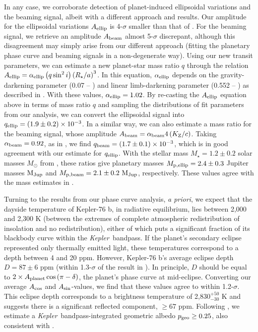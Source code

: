 \documentclass[manuscript]{aastex62}
\newcommand{\kepler}{{\it Kepler}}
\begin{document}
In any case, we corroborate detection of planet-induced ellipsoidal variations and the beaming signal, albeit with a different approach and results. Our amplitude for the ellipsoidal variations $A_{\rm ellip}$ is 4-$\sigma$ smaller than that of \citet{2013ApJ...771...26F}. For the beaming signal, we retrieve an amplitude $A_{\rm beam}$ almost 5-$\sigma$ discrepant, although this disagreement may simply arise from our different approach (fitting the planetary phase curve and beaming signals in a non-degenerate way). Using our new transit parameters, we can estimate a new planet-star mass ratio $q$ through the relation $A_{\rm ellip} = \alpha_{\rm ellip} \left( q \sin^2 i \right) \left( R_\star / a \right)^{3}$. In this equation, $\alpha_{\rm ellip}$ depends on the gravity-darkening parameter (0.07 -- \citealp{2011AA...529A..75C}) and linear limb-darkening parameter (0.552 -- \citealp{2015MNRAS.450.1879E}) as described in \citet{1985ApJ...295..143M}. With these values, $\alpha_{\rm ellip} = 1.02$. By re-casting the $A_{\rm ellip}$ equation above in terms of mass ratio $q$ and sampling the distributions of fit parameters from our analysis, we can convert the ellipsoidal signal into $q_{\rm ellip} = \left( 1.9 \pm 0.2 \right) \times 10^{-3}$. In a similar way, we can also estimate a mass ratio for the beaming signal, whose amplitude $A_{\rm beam} = \alpha_{\rm beam} 4 \left( K_{\rm Z} / c \right)$. Taking $\alpha_{\rm beam} = 0.92$, as in \citet{2013ApJ...771...26F}, we find $q_{\rm beam} = \left( 1.7\pm 0.1 \right) \times 10^{-3}$, which is in good agreement with our estimate for $q_{\rm ellip}$. With the stellar mass $M_\star = 1.2 \pm 0.2$ solar masses $M_{\odot}$ from \citet{2013ApJ...771...26F}, these ratios give planetary masses $M_{\rm p, ellip} = 2.4 \pm 0.3$ Jupiter masses ${\rm M_{Jup}}$ and $M_{\rm p, beam} = 2.1 \pm 0.2\ {\rm M_{Jup}}$, respectively. These values agree with the mass estimates in \citet{2013ApJ...771...26F}.

Turning to the results from our phase curve analysis, \emph{a priori}, we expect that the dayside temperature of Kepler-76 b, in radiative equilibrium, lies between 2,000 and 2,300 K (between the extremes of complete atmospheric redistribution of insolation and no redistribution), either of which puts a significant fraction of its blackbody curve within the \kepler\ bandpass. If the planet's secondary eclipse represented only thermally emitted light, these temperatures correspond to a depth between 4 and 20 ppm. However, Kepler-76 b's average eclipse depth $D = 87 \pm 6$ ppm (within 1.3-$\sigma$ of the result in  \citealt{2013ApJ...771...26F}). In principle, $D$ should be equal to $2\times A_{\rm planet} \cos \left( \pi - \delta \right)$, the planet's phase curve at mid-eclipse. Converting our average $A_{\rm cos}$ and $A_{\rm sin}$-values, we find that these values agree to within 1.2-$\sigma$. This eclipse depth corresponds to a brightness temperature of 2,830$^{+50}_{-30}$ K and suggests there is a significant reflected component, $\geq 67$ ppm. Following \citet{2011MNRAS.415.3921F}, we estimate a \kepler\ bandpass-integrated geometric albedo $p_{\rm geo} \geq 0.25$, also consistent with \citet{2013ApJ...771...26F}.
\end{document}
